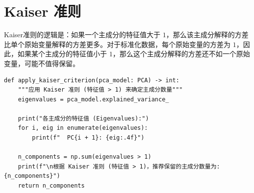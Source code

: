 \section{Kaiser 准则}

\begin{definition}[Kaiser 准则]
    Kaiser准则的逻辑是：如果一个主成分的特征值大于 $1$，那么该主成分解释的方差比单个原始变量解释的方差更多。对于标准化数据，每个原始变量的方差为 $1$，因此，如果某个主成分的特征值小于 $1$，那么这个主成分解释的方差还不如一个原始变量，可能不值得保留。
\end{definition}

\begin{lstlisting}[style=python]
def apply_kaiser_criterion(pca_model: PCA) -> int:
    """应用 Kaiser 准则 (特征值 > 1) 来确定主成分数量"""
    eigenvalues = pca_model.explained_variance_

    print("各主成分的特征值 (Eigenvalues):")
    for i, eig in enumerate(eigenvalues):
        print(f"  PC{i + 1}: {eig:.4f}")

    n_components = np.sum(eigenvalues > 1)
    print(f"\n根据 Kaiser 准则 (特征值 > 1)，推荐保留的主成分数量为: {n_components}")
    return n_components
\end{lstlisting}

